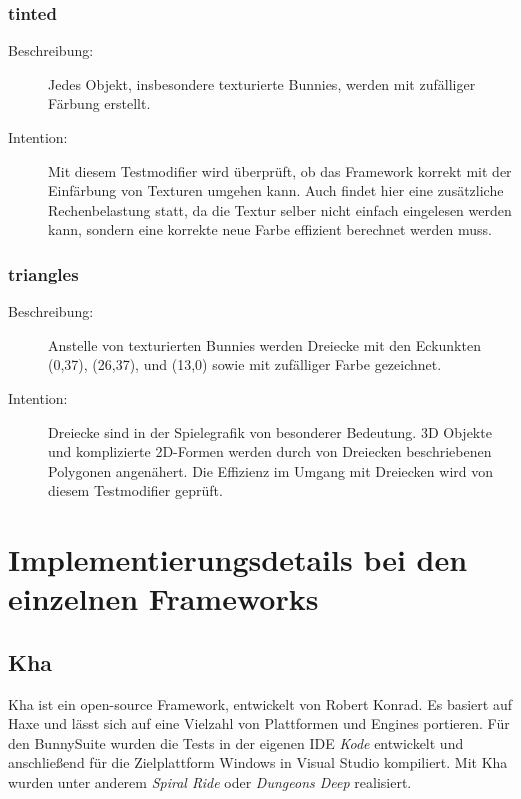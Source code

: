 \subsubsection{tinted}
\begin{description}
\item[Beschreibung:] Jedes Objekt, insbesondere texturierte Bunnies, werden mit zufälliger Färbung erstellt. \\
\item[Intention:] Mit diesem Testmodifier wird überprüft, ob das Framework korrekt mit der Einfärbung von Texturen umgehen kann. Auch findet hier eine zusätzliche Rechenbelastung statt, da die Textur selber nicht einfach eingelesen werden kann, sondern eine korrekte neue Farbe effizient berechnet werden muss.
\end{description}

\subsubsection{triangles}
\begin{description}
\item[Beschreibung:] Anstelle von texturierten Bunnies werden Dreiecke mit den Eckunkten (0,37), (26,37), und (13,0) sowie mit zufälliger Farbe gezeichnet. \\
\item[Intention:] Dreiecke sind in der Spielegrafik von besonderer Bedeutung. 3D Objekte und komplizierte 2D-Formen werden durch von Dreiecken beschriebenen Polygonen angenähert. Die Effizienz im Umgang mit Dreiecken wird von diesem Testmodifier geprüft.
\end{description}

\section{Implementierungsdetails bei den einzelnen Frameworks}
\subsection{Kha}
Kha ist ein open-source Framework, entwickelt von Robert Konrad. Es basiert auf Haxe und lässt sich auf eine Vielzahl von Plattformen und Engines portieren. Für den BunnySuite wurden die Tests in der eigenen IDE \textit{Kode} entwickelt und anschließend für die Zielplattform Windows in Visual Studio kompiliert. Mit Kha wurden unter anderem \emph{Spiral Ride} oder \emph{Dungeons Deep} realisiert.

